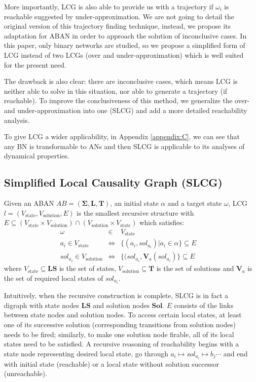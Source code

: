 \documentclass[runningheads]{llncs}
\begin{document}
More importantly, LCG is also able to provide us with a trajectory if $\omega_i$ is reachable suggested by under-approximation.
We are not going to detail the original version of this trajectory finding technique, instead, we propose its adaptation for ABAN in order to approach the solution of inconclusive cases.
In this paper, only binary networks are studied, so we propose a simplified form of LCG instead of two LCGs (over and under-approximation) which is well suited for the present need.

The drawback is also clear: there are inconclusive cases, which means LCG is neither able to solve in this situation, nor able to generate a trajectory (if reachable).
To improve the conclusiveness of this method, we generalize the over- and under-approximation into one (SLCG) and add a more detailed reachability analysis.

To give LCG a wider applicability, in Appendix \ref{appendix:C}, we can see that any BN is transformable to ANs and then SLCG is applicable to its analyses of dynamical properties.
\subsection{Simplified Local Causality Graph (SLCG)}

\begin{definition}[LCG]\label{defLCG}
Given an ABAN $AB = (\mathbf{\Sigma},\mathbf{L},\mathbf{T})$, an initial state $\alpha$ and a target state $\omega$, LCG $l= (V_{\mathrm{state}},V_{\mathrm{solution}},E)$ is the smallest recursive structure with $E \subseteq (V_{\mathrm{state}}\times V_{\mathrm{solution}})\cap (V_{\mathrm{solution}}\times V_{\mathrm{state}})$ which satisfies:
\begin{eqnarray*}
    \omega&\in& V_{\mathrm{state}} \\
    a_i\in V_{\mathrm{state}} &\Leftrightarrow& \{ (a_i, sol_{a_i})| a_i\in \alpha\}\subseteq E \\
    sol_{a_i}\in V_{\mathrm{solution}}&\Leftrightarrow& \{ (sol_{a_i},\mathbf{V}_a (sol_{a_i})\}\subseteq E
\end{eqnarray*}
where $V_{\mathrm{state}}\subseteq\mathbf{LS}$ is the set of states, $V_{\mathrm{solution}}\subseteq \mathbf{T}$ is the set of solutions and $\mathbf{V}_a$ is the set of required local states of $sol_{a_i}$.
\end{definition}
Intuitively, when the recursive construction is complete, SLCG is in fact a digraph with state nodes $\mathbf{LS}$ and solution nodes $\mathbf{Sol}$. 
$E$ consists of the links between state nodes and solution nodes. 
To access certain local states, at least one of its successive solution (corresponding transitions from solution nodes) needs to be fired; similarly, to make one solution node firable, all of its local states need to be satisfied. 
A recursive reasoning of reachability begins with a state node representing desired local state, go through $a_i\mapsto sol_{a_i}\mapsto b_j \cdots$ and end with initial state (reachable) or a local state without solution successor (unreachable).
\end{document}

